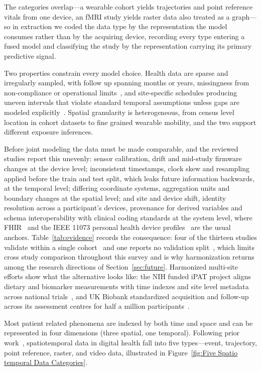 \documentclass[journal]{IEEEtran}
\newif\ifsubmission
\begin{document}
The categories overlap---a wearable cohort yields trajectories and point reference vitals from one device, an fMRI study yields raster data also treated as a graph---so in extraction we coded the data type by the representation the model consumes rather than by the acquiring device, recording every type entering a fused model and classifying the study by the representation carrying its primary predictive signal.

Two properties constrain every model choice. Health data are sparse and irregularly sampled, with follow up spanning months or years, missingness from non-compliance or operational limits~\cite{che2018grud}, and site-specific schedules producing uneven intervals that violate standard temporal assumptions unless gaps are modeled explicitly~\cite{shukla2021irregular}. Spatial granularity is heterogeneous, from census level location in cohort datasets to fine grained wearable mobility, and the two support different exposure inferences.

Before joint modeling the data must be made comparable, and the reviewed studies report this unevenly: sensor calibration, drift and mid-study firmware changes at the device level; inconsistent timestamps, clock skew and resampling applied before the train and test split, which leaks future information backwards, at the temporal level; differing coordinate systems, aggregation units and boundary changes at the spatial level; and site and device shift, identity resolution across a participant's devices, provenance for derived variables and schema interoperability with clinical coding standards at the system level, where FHIR~\cite{ayaz2021fhir} and the IEEE 11073 personal health device profiles~\cite{ieee11073std} are the usual anchors. Table~\ref{tab:evidence} records the consequence: four of the thirteen studies validate within a single cohort~\cite{2,9,Lim2025VirtualCGM,glaser2022deep} and one reports no validation split~\cite{XiaoLi2016DiabetesSpatiotemporal}, which limits cross study comparison throughout this survey and is why harmonization returns among the research directions of Section~\ref{sec:future}. Harmonized multi-site efforts show what the alternative looks like: the NIH funded iPAT project aligns dietary and biomarker measurements with time indexes and site level metadata across national trials~\cite{Fang2021iPAT}, and UK Biobank standardized acquisition and follow-up across its assessment centres for half a million participants~\cite{sudlow2015ukbiobank}.
\else

Most patient related phenomena are indexed by both time and space and can be represented in four dimensions (three spatial, one temporal). Following prior work~\cite{wang2022deep,atluri2018stdm}, spatiotemporal data in digital health fall into five types---event, trajectory, point reference, raster, and video data\ifsubmission\else , illustrated in Figure~\ref{fig:Five Spatio temporal Data Categories}\fi .
\end{document}
